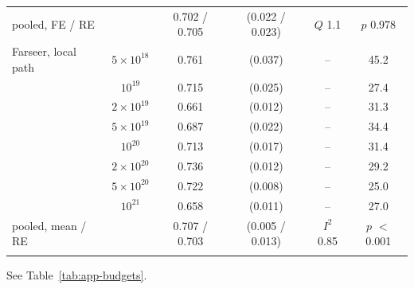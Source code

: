 \begin{table}[tp]
\begin{tabular*}{\textwidth}{@{\extracolsep{\fill}}>{\raggedright\arraybackslash}p{}ccccc@{}}
\quad pooled, FE / RE & & 0.702 / 0.705 & (0.022 / 0.023) & $Q$ 1.1 & $p$ 0.978 \\
\addlinespace
Farseer, local path & $5\times10^{18}$ & 0.761 & (0.037) & -- & 45.2 \\
 & $10^{19}$ & 0.715 & (0.025) & -- & 27.4 \\
 & $2\times10^{19}$ & 0.661 & (0.012) & -- & 31.3 \\
 & $5\times10^{19}$ & 0.687 & (0.022) & -- & 34.4 \\
 & $10^{20}$ & 0.713 & (0.017) & -- & 31.4 \\
 & $2\times10^{20}$ & 0.736 & (0.012) & -- & 29.2 \\
 & $5\times10^{20}$ & 0.722 & (0.008) & -- & 25.0 \\
 & $10^{21}$ & 0.658 & (0.011) & -- & 27.0 \\
\quad pooled, mean / RE & & 0.707 / 0.703 & (0.005 / 0.013) & $I^2$ 0.85 & $p$ $<$0.001 \\
\addlinespace
\bottomrule
\end{tabular*}

\begin{tablenotes}
See Table~\ref{tab:app-budgets}.
\end{tablenotes}
\end{table}
